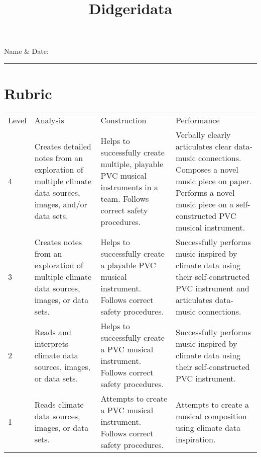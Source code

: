 \documentclass[letterpaper,12pt]{scrartcl}
\title{
Didgeridata
}\let\myTitle\@title
\begin{document}
\thispagestyle{fancy}
\noindent Name \& Date:\\ %
\rule{\textwidth}{1pt}    %

\section*{Rubric}
\begin{table}[h!]
	\begin{tabular}{p{1cm}p{4cm}p{4cm}p{4cm}}
		Level & Analysis & Construction & Performance\\
		4     & Creates detailed notes from an exploration of multiple climate data sources, images, and/or data sets. 
		      & Helps to successfully create multiple, playable PVC musical instruments in a team. Follows correct safety procedures. 
		      & Verbally clearly articulates clear data-music connections. Composes a novel music piece on paper. Performs a novel music piece on a self-constructed PVC musical instrument. \\
		3     & Creates notes from an exploration of multiple climate data sources, images, or data sets.             
		      & Helps to successfully create a playable PVC musical instrument. Follows correct safety procedures. 
		      & Successfully performs music inspired by climate data using their self-constructed PVC instrument and articulates data-music connections. \\
		2     & Reads and interprets climate data sources, images, or data sets.                                       
		      & Helps to successfully create a PVC musical instrument. Follows correct safety procedures.                             
		      & Successfully performs music inspired by climate data using their self-constructed PVC instrument.\\
		1     & Reads climate data sources, images, or data sets.                                                      
		      & Attempts to create a PVC musical instrument. Follows correct safety procedures.
		      & Attempts to create a musical composition using climate data inspiration.                                                                                                                                            
	\end{tabular}
\end{table}




\end{document}
